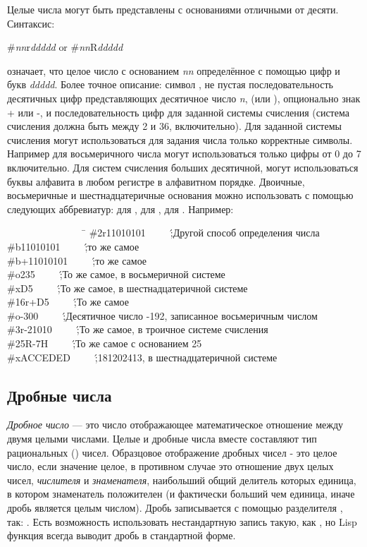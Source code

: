 Целые числа могут быть представлены с основаниями отличными от
десяти. Синтаксис: 
\begin{lisp}
\#\emph{nn}r\emph{ddddd}     \textrm{or}     \#\emph{nn}R\emph{ddddd}
\end{lisp}
означает, что целое число с основанием \emph{nn} определённое с
помощью цифр и букв \emph{ddddd}. Более точное описание:
символ \cd{\#}, не пустая последовательность десятичных цифр
представляющих десятичное число \emph{n},  (или ), опционально
знак + или -, и последовательность цифр для заданной системы счисления (система
счисления должна быть между 2 и 36, включительно). Для
заданной системы счисления могут использоваться для задания числа только
корректные символы. Например для
восьмеричного числа могут использоваться только цифры от 0 до 7
включительно. Для систем счисления больших десятичной, могут использоваться
буквы алфавита в любом регистре в алфавитном порядке. Двоичные, восьмеричные и
шестнадцатеричные основания можно использовать с помощью следующих аббревиатур:
 для ,  для ,  для
. Например:
\begin{lisp}
~~~~~~~~~~~~~~~~\=\kill
\>\#2r11010101~~~~~\';\textrm{Другой способ определения
числа } \\
\>\#b11010101~~~~~\';\textrm{то же самое} \\
\>\#b+11010101~~~~~\';\textrm{то же самое} \\
\>\#o235~~~~~\';\textrm{То же самое, в восьмеричной системе} \\
\>\#xD5~~~~~\';\textrm{То же самое, в шестнадцатеричной системе} \\
\>\#16r+D5~~~~~\';\textrm{То же самое} \\
\>\#o-300~~~~~\';\textrm{Десятичное число -192, записанное восьмеричным числом} \\
\>\#3r-21010~~~~~\';\textrm{То же самое, в троичное системе счисления} \\
\>\#25R-7H~~~~~\';\textrm{То же самое с основанием 25} \\
\>\#xACCEDED~~~~~\';\textrm{181202413, в шестнадцатеричной системе}
\end{lisp}

\subsection{Дробные числа}

\emph{Дробное число} --- это число отображающее математическое отношение
между двумя целыми числами. Целые и дробные числа вместе
составляют тип рациональных () чисел. Образцовое
отображение дробных чисел - это целое число, если значение целое,
в противном случае это отношение двух целых чисел, \emph{числителя} и
\emph{знаменателя}, наибольший общий делитель которых единица, в котором
знаменатель положителен (и фактически больший чем единица, иначе
дробь является целым числом). Дробь записывается с помощью
разделителя \cdf{/}, так: . Есть возможность
использовать нестандартную запись такую, как , но Lisp
функция  всегда выводит дробь в стандартной форме. 

